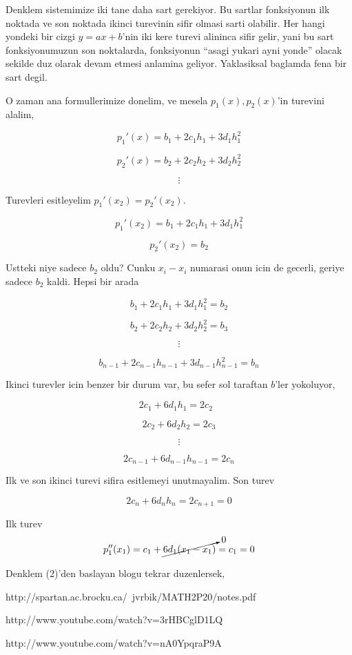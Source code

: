 \documentclass[12pt,fleqn]{article}\usepackage{common}
\begin{document}
Denklem sistemimize iki tane daha sart gerekiyor. Bu sartlar fonksiyonun
ilk noktada ve son noktada ikinci turevinin sifir olmasi sarti
olabilir. Her hangi yondeki bir cizgi $y = ax + b$'nin iki kere turevi
alininca sifir gelir, yani bu sart fonksiyonumuzun son noktalarda,
fonksiyonun ``asagi yukari ayni yonde'' olacak sekilde duz olarak devam
etmesi anlamina geliyor. Yaklasiksal baglamda fena bir sart degil. 

O zaman ana formullerimize donelim, ve mesela $p_1(x),p_2(x)$'in turevini
alalim,

\[ p_1'(x) = b_1 + 2c_1h_1 + 3d_1h_1^2 \]

\[ p_2'(x) = b_2 + 2c_2h_2 + 3d_2h_2^2 \]

\[ \vdots \]


Turevleri esitleyelim $p_1'(x_2) = p_2'(x_2)$. 

\[ p_1'(x_2) = b_1 + 2c_1h_1 + 3d_1h_1^2 \]

\[  p_2'(x_2) = b_2 \]

Ustteki niye sadece $b_2$ oldu? Cunku $x_i-x_i$ numarasi onun icin de
gecerli, geriye sadece $b_2$ kaldi. Hepsi bir arada

\[  b_1 + 2c_1h_1 + 3d_1h_1^2  = b_2 \]

\[  b_2 + 2c_2h_2 + 3d_2h_2^2 = b_3 \]

\[ \vdots \]

\[  b_{n-1} + 2c_{n-1}h_{n-1} + 3d_{n-1}h_{n-1}^2 =  b_n \]

Ikinci turevler icin benzer bir durum var, bu sefer sol taraftan $b$'ler
yokoluyor, 

\[ 2c_1 + 6d_1h_1 = 2c_2 \ \ \ \label{2} \]

\[ 2c_2 + 6d_2h_2 = 2c_3 \]

\[ \vdots \]

\[ 2c_{n-1} + 6d_{n-1}h_{n-1} = 2c_n \]

Ilk ve son ikinci turevi sifira esitlemeyi unutmayalim. Son turev

\[ 2c_n + 6d_nh_n = 2c_{n+1} = 0 \]

Ilk turev
\[ p_1''(x_1) =  c_1 + \cancelto{0}{6d_1(x_1-x_1)}  = c_1 = 0\]

Denklem (2)'den baslayan blogu tekrar duzenlersek, 
















http://spartan.ac.brocku.ca/~jvrbik/MATH2P20/notes.pdf

http://www.youtube.com/watch?v=3rHBCglD1LQ

http://www.youtube.com/watch?v=nA0YpqraP9A
\end{document}
